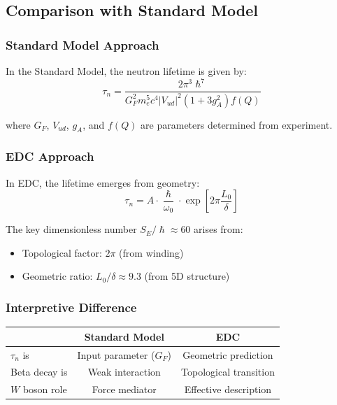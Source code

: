 \documentclass[11pt,a4paper]{article}
\newcommand{\hbar}{\hslash}
\begin{document}
\subsection{Comparison with Standard Model}

\subsubsection{Standard Model Approach}

In the Standard Model, the neutron lifetime is given by:
\begin{equation}
\tau_n = \frac{2\pi^3 \hbar^7}{G_F^2 m_e^5 c^4 |V_{ud}|^2 (1 + 3g_A^2) f(Q)}
\end{equation}

where $G_F$, $V_{ud}$, $g_A$, and $f(Q)$ are parameters determined from experiment.

\subsubsection{EDC Approach}

In EDC, the lifetime emerges from geometry:
\begin{equation}
\tau_n = A \cdot \frac{\hbar}{\omega_0} \cdot \exp\left[2\pi \frac{L_0}{\delta}\right]
\end{equation}

The key dimensionless number $S_E/\hbar \approx 60$ arises from:
\begin{itemize}
\item Topological factor: $2\pi$ (from winding)
\item Geometric ratio: $L_0/\delta \approx 9.3$ (from 5D structure)
\end{itemize}

\subsubsection{Interpretive Difference}

\begin{center}
\begin{tabular}{lcc}
\toprule
& \textbf{Standard Model} & \textbf{EDC} \\
\midrule
$\tau_n$ is & Input parameter ($G_F$) & Geometric prediction \\
Beta decay is & Weak interaction & Topological transition \\
$W$ boson role & Force mediator & Effective description \\
\bottomrule
\end{tabular}
\end{center}
\end{document}
